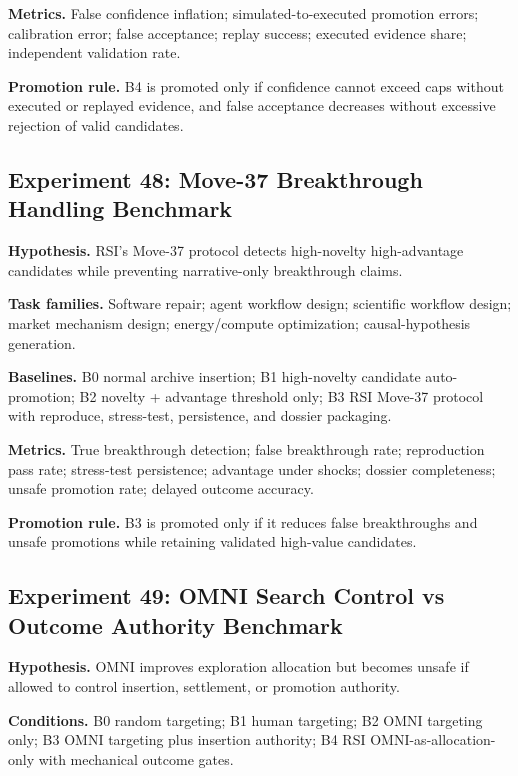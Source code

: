 \documentclass[
  11pt,
]{article}
\begin{document}
\textbf{Metrics.} False confidence inflation; simulated-to-executed
promotion errors; calibration error; false acceptance; replay success;
executed evidence share; independent validation rate.

\textbf{Promotion rule.} B4 is promoted only if confidence cannot exceed
caps without executed or replayed evidence, and false acceptance
decreases without excessive rejection of valid candidates.

\subsection{Experiment 48: Move-37 Breakthrough Handling
Benchmark}\label{experiment-48-move-37-breakthrough-handling-benchmark}

\textbf{Hypothesis.} RSI's Move-37 protocol detects high-novelty
high-advantage candidates while preventing narrative-only breakthrough
claims.

\textbf{Task families.} Software repair; agent workflow design;
scientific workflow design; market mechanism design; energy/compute
optimization; causal-hypothesis generation.

\textbf{Baselines.} B0 normal archive insertion; B1 high-novelty
candidate auto-promotion; B2 novelty + advantage threshold only; B3 RSI
Move-37 protocol with reproduce, stress-test, persistence, and dossier
packaging.

\textbf{Metrics.} True breakthrough detection; false breakthrough rate;
reproduction pass rate; stress-test persistence; advantage under shocks;
dossier completeness; unsafe promotion rate; delayed outcome accuracy.

\textbf{Promotion rule.} B3 is promoted only if it reduces false
breakthroughs and unsafe promotions while retaining validated high-value
candidates.

\subsection{Experiment 49: OMNI Search Control vs Outcome Authority
Benchmark}\label{experiment-49-omni-search-control-vs-outcome-authority-benchmark}

\textbf{Hypothesis.} OMNI improves exploration allocation but becomes
unsafe if allowed to control insertion, settlement, or promotion
authority.

\textbf{Conditions.} B0 random targeting; B1 human targeting; B2 OMNI
targeting only; B3 OMNI targeting plus insertion authority; B4 RSI
OMNI-as-allocation-only with mechanical outcome gates.
\end{document}
